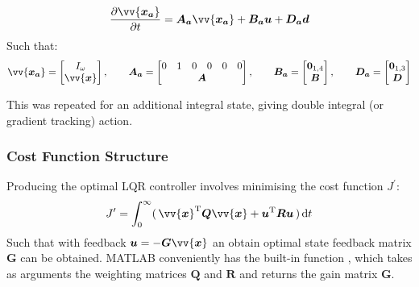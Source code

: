     \begin{equation}
            \frac{ \partial \vv{\bm{x_a}} }{ \partial t }   =  \bm{A_a} \vv{\bm{x_a}} + \bm{B_a}{\bm{u}} + \bm{D_a} \bm{d}
    \end{equation}
    Such that:
    \begin{equation}
            \vv{\bm{x_a}} = 
            \begin{bmatrix}
                    I_{\omega}\\
                    \vv{\bm{x}}
            \end{bmatrix}
        , \qquad
            \bm{A_a} = 
            \begin{bmatrix}
                    0 & 1 & 0 & 0 & 0 & 0\\
                 \multicolumn{6}{c}{\smash{\raisebox{0\normalbaselineskip}{$ \bm{A} $}}}\\
            \end{bmatrix}
        , \qquad
            \bm{B_a} = 
            \begin{bmatrix}
                    \bm{0}_{1,4}\\
                    \bm{B}
            \end{bmatrix}
        , \qquad
            \bm{D_a} = 
            \begin{bmatrix}
                    \bm{0}_{1,3}\\
                    \bm{D}
            \end{bmatrix}
    \end{equation}

This was repeated for an additional integral state, giving double integral (or gradient tracking) action.


\subsubsection{Cost Function Structure}

Producing the optimal LQR controller involves minimising the cost function $J^{\prime}$: 
\begin{equation}
        J^{\prime} = \int^{\infty}_{0} (\, \vv{\bm{x}}^{\mathrm{T}} \bm{Q} \vv{\bm{x}} + \bm{u}^{\mathrm{T}} \bm{R} \bm{u} \,) \, \dd t
\end{equation}
Such that with feedback  $\bm{u} = -\bm{G} \vv{\bm{x}}$ an obtain optimal state feedback matrix $\bm{G}$ can be obtained.
MATLAB conveniently has the built-in function , which takes as arguments the weighting matrices $\bm{Q}$ and $\bm{R}$ and returns the gain matrix $\bm{G}$.

